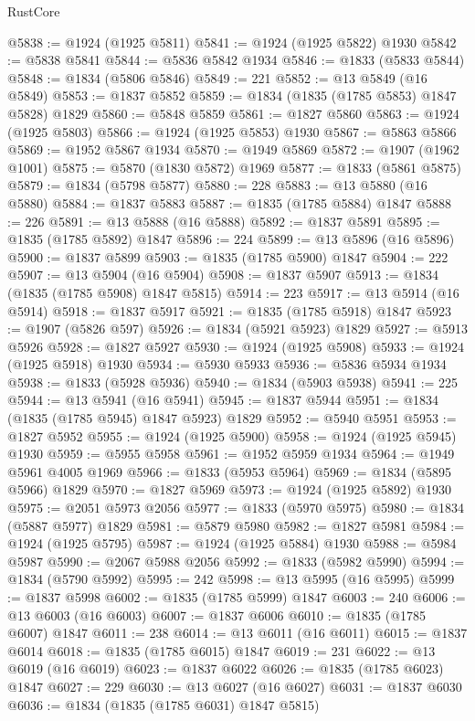 \begin{lexlean}{RustCore}
\begin{coremodule}
@5838 := @1924 (@1925 @5811)
@5841 := @1924 (@1925 @5822) @1930
@5842 := @5838 @5841
@5844 := @5836 @5842 @1934
@5846 := @1833 (@5833 @5844)
@5848 := @1834 (@5806 @5846)
@5849 := 221
@5852 := @13 @5849 (@16 @5849)
@5853 := @1837 @5852
@5859 := @1834 (@1835 (@1785 @5853) @1847 @5828) @1829
@5860 := @5848 @5859
@5861 := @1827 @5860
@5863 := @1924 (@1925 @5803)
@5866 := @1924 (@1925 @5853) @1930
@5867 := @5863 @5866
@5869 := @1952 @5867 @1934
@5870 := @1949 @5869
@5872 := @1907 (@1962 @1001)
@5875 := @5870 (@1830 @5872) @1969
@5877 := @1833 (@5861 @5875)
@5879 := @1834 (@5798 @5877)
@5880 := 228
@5883 := @13 @5880 (@16 @5880)
@5884 := @1837 @5883
@5887 := @1835 (@1785 @5884) @1847
@5888 := 226
@5891 := @13 @5888 (@16 @5888)
@5892 := @1837 @5891
@5895 := @1835 (@1785 @5892) @1847
@5896 := 224
@5899 := @13 @5896 (@16 @5896)
@5900 := @1837 @5899
@5903 := @1835 (@1785 @5900) @1847
@5904 := 222
@5907 := @13 @5904 (@16 @5904)
@5908 := @1837 @5907
@5913 := @1834 (@1835 (@1785 @5908) @1847 @5815)
@5914 := 223
@5917 := @13 @5914 (@16 @5914)
@5918 := @1837 @5917
@5921 := @1835 (@1785 @5918) @1847
@5923 := @1907 (@5826 @597)
@5926 := @1834 (@5921 @5923) @1829
@5927 := @5913 @5926
@5928 := @1827 @5927
@5930 := @1924 (@1925 @5908)
@5933 := @1924 (@1925 @5918) @1930
@5934 := @5930 @5933
@5936 := @5836 @5934 @1934
@5938 := @1833 (@5928 @5936)
@5940 := @1834 (@5903 @5938)
@5941 := 225
@5944 := @13 @5941 (@16 @5941)
@5945 := @1837 @5944
@5951 := @1834 (@1835 (@1785 @5945) @1847 @5923) @1829
@5952 := @5940 @5951
@5953 := @1827 @5952
@5955 := @1924 (@1925 @5900)
@5958 := @1924 (@1925 @5945) @1930
@5959 := @5955 @5958
@5961 := @1952 @5959 @1934
@5964 := @1949 @5961 @4005 @1969
@5966 := @1833 (@5953 @5964)
@5969 := @1834 (@5895 @5966) @1829
@5970 := @1827 @5969
@5973 := @1924 (@1925 @5892) @1930
@5975 := @2051 @5973 @2056
@5977 := @1833 (@5970 @5975)
@5980 := @1834 (@5887 @5977) @1829
@5981 := @5879 @5980
@5982 := @1827 @5981
@5984 := @1924 (@1925 @5795)
@5987 := @1924 (@1925 @5884) @1930
@5988 := @5984 @5987
@5990 := @2067 @5988 @2056
@5992 := @1833 (@5982 @5990)
@5994 := @1834 (@5790 @5992)
@5995 := 242
@5998 := @13 @5995 (@16 @5995)
@5999 := @1837 @5998
@6002 := @1835 (@1785 @5999) @1847
@6003 := 240
@6006 := @13 @6003 (@16 @6003)
@6007 := @1837 @6006
@6010 := @1835 (@1785 @6007) @1847
@6011 := 238
@6014 := @13 @6011 (@16 @6011)
@6015 := @1837 @6014
@6018 := @1835 (@1785 @6015) @1847
@6019 := 231
@6022 := @13 @6019 (@16 @6019)
@6023 := @1837 @6022
@6026 := @1835 (@1785 @6023) @1847
@6027 := 229
@6030 := @13 @6027 (@16 @6027)
@6031 := @1837 @6030
@6036 := @1834 (@1835 (@1785 @6031) @1847 @5815)

\end{coremodule}
\end{lexlean}

